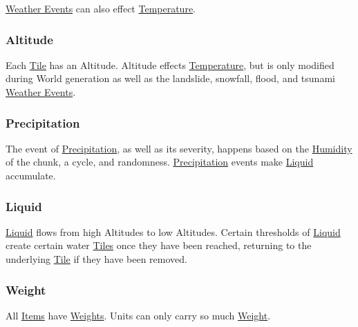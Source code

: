 \documentclass[11pt]{article}
\begin{document}
\hyperref[org3b0b756]{Weather Events} can also effect \hyperref[org1131659]{Temperature}.\\
\subsubsection{Altitude}
\label{sec:org810a562}
Each \hyperref[org938ee1c]{Tile} has an Altitude. Altitude effects \hyperref[org1131659]{Temperature}, but is only modified during World generation as well as the landslide, snowfall, flood, and tsunami \hyperref[org3b0b756]{Weather Events}.\\
\subsubsection{Precipitation \label{orgf5cfa92} \label{org33fd3d1}}
\label{sec:orgd30fdd3}
The event of \hyperref[orgf5cfa92]{Precipitation}, as well as its severity, happens based on the \hyperref[org1479080]{Humidity} of the chunk, a cycle, and randomness. \hyperref[orgf5cfa92]{Precipitation} events make \hyperref[org5860b41]{Liquid} accumulate.\\
\subsubsection{Liquid \label{org5860b41} \label{orgbbaca6d}}
\label{sec:org8842a9a}
\hyperref[org5860b41]{Liquid} flows from high Altitudes to low Altitudes. Certain thresholds of \hyperref[org5860b41]{Liquid} create certain water \hyperref[org5189a7f]{Tiles} once they have been reached, returning to the underlying \hyperref[org938ee1c]{Tile} if they have been removed.\\
\subsubsection{Weight \label{orgf5aa833} \label{org2af32af}}
\label{sec:orgb25d010}
All \hyperref[org4612467]{Items} have \hyperref[org2af32af]{Weights}. Units can only carry so much \hyperref[orgf5aa833]{Weight}.\\
\end{document}
